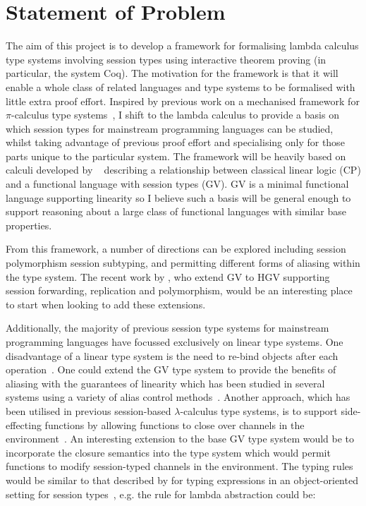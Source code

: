 \documentclass{mprop}
\newcommand{\1}{\textbf{1}\xspace}
\begin{document}
\section{Statement of Problem}

The aim of this project is to develop a framework for formalising lambda
calculus type systems involving session types using interactive theorem
proving (in particular, the system Coq). The motivation for the framework is
that it will enable a whole class of related languages and type systems to be
formalised with little extra proof effort. Inspired by previous work on a
mechanised framework for $\pi$-calculus type systems~\cite{Gay:2001:FFP}, I
shift to the lambda calculus to provide a basis on which session types for
mainstream programming languages can be studied, whilst taking advantage of
previous proof effort and specialising only for those parts unique to the
particular system. The framework will be heavily based on calculi developed by
\citeauthor{Wadler:2012}~\cite{Wadler:2012} describing a relationship between
classical linear logic (CP) and a functional language with session types
(GV). GV is a minimal functional language supporting linearity so I believe
such a basis will be general enough to support reasoning about a large class
of functional languages with similar base properties.

From this framework, a number of directions can be explored including session
polymorphism session subtyping, and permitting different forms of aliasing
within the type system. The recent work by \citeauthor{Lindley:2014:SAP}
\cite{Lindley:2014:SAP}, who extend GV to HGV supporting session forwarding,
replication and polymorphism, would be an interesting place to start when
looking to add these extensions.

Additionally, the majority of previous session type systems for mainstream
programming languages have focussed exclusively on linear type systems. One
disadvantage of a linear type system is the need to re-bind objects after each
operation~\cite{Gay:2010:LAST}. One could extend the GV type system to provide
the benefits of aliasing with the guarantees of linearity which has been
studied in several systems using a variety of alias control
methods~\cite{Fahndrich:2002,Mazurak:2010:LLT,Tov:2011}. Another approach,
which has been utilised in previous session-based $\lambda$-calculus type
systems, is to support side-effecting functions by allowing functions to close
over channels in the environment~\cite{Gay:2003:STI,Vasconcelos:2006:TCM}. An
interesting extension to the base GV type system would be to incorporate the
closure semantics into the type system which would permit functions to modify
session-typed channels in the environment. The typing rules would be similar
to that described by \citeauthor{Gay:2010:MST} for typing expressions in an
object-oriented setting for session types~\cite{Gay:2010:MST}, e.g. the rule
for lambda abstraction could be:
\end{document}
